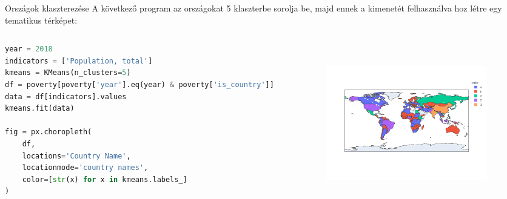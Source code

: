 \documentclass[english, aspectratio=169]{beamer}
\begin{document}
	\begin{frame}[fragile]{Országok klaszterezése}
		A következő program az országokat 5 klaszterbe sorolja be, majd ennek a kimenetét felhasználva hoz létre egy tematikus térképet:\par\smallskip
		\begin{columns}
			\begin{column}{.5\textwidth}
				\begin{lstlisting}[language=python]
year = 2018
indicators = ['Population, total']
kmeans = KMeans(n_clusters=5)
df = poverty[poverty['year'].eq(year) & poverty['is_country']]
data = df[indicators].values
kmeans.fit(data)

fig = px.choropleth(
	df,
	locations='Country Name',
	locationmode='country names',
	color=[str(x) for x in kmeans.labels_]
)	
				\end{lstlisting}
			\end{column}
			\begin{column}{.5\textwidth}
				\begin{center}
					\includegraphics[width=7cm, height=7cm, keepaspectratio]{images/freq_16.png}
				\end{center}
			\end{column}
		\end{columns}
	\end{frame}
	
\end{document}
